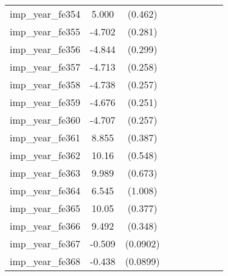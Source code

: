 {\begin{tabular}{l*{4}{cc}}
imp\_year\_fe354&    5.000\sym{***}&  (0.462)&                  &         &                  &         &                  &         \\
imp\_year\_fe355&   -4.702\sym{***}&  (0.281)&                  &         &                  &         &                  &         \\
imp\_year\_fe356&   -4.844\sym{***}&  (0.299)&                  &         &                  &         &                  &         \\
imp\_year\_fe357&   -4.713\sym{***}&  (0.258)&                  &         &                  &         &                  &         \\
imp\_year\_fe358&   -4.738\sym{***}&  (0.257)&                  &         &                  &         &                  &         \\
imp\_year\_fe359&   -4.676\sym{***}&  (0.251)&                  &         &                  &         &                  &         \\
imp\_year\_fe360&   -4.707\sym{***}&  (0.257)&                  &         &                  &         &                  &         \\
imp\_year\_fe361&    8.855\sym{***}&  (0.387)&                  &         &                  &         &                  &         \\
imp\_year\_fe362&    10.16\sym{***}&  (0.548)&                  &         &                  &         &                  &         \\
imp\_year\_fe363&    9.989\sym{***}&  (0.673)&                  &         &                  &         &                  &         \\
imp\_year\_fe364&    6.545\sym{***}&  (1.008)&                  &         &                  &         &                  &         \\
imp\_year\_fe365&    10.05\sym{***}&  (0.377)&                  &         &                  &         &                  &         \\
imp\_year\_fe366&    9.492\sym{***}&  (0.348)&                  &         &                  &         &                  &         \\
imp\_year\_fe367&   -0.509\sym{***}& (0.0902)&                  &         &                  &         &                  &         \\
imp\_year\_fe368&   -0.438\sym{***}& (0.0899)&                  &         &                  &         &                  &         \\

\end{tabular}}
